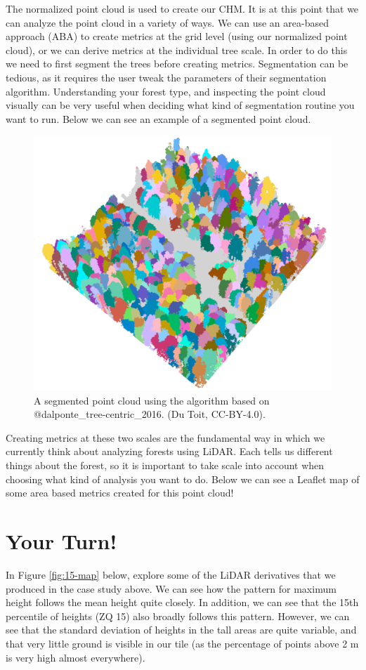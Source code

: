 \documentclass[
]{book}
\begin{document}
The normalized point cloud is used to create our CHM. It is at this point that we can analyze the point cloud in a variety of ways. We can use an area-based approach (ABA) to create metrics at the grid level (using our normalized point cloud), or we can derive metrics at the individual tree scale. In order to do this we need to first segment the trees before creating metrics. Segmentation can be tedious, as it requires the user tweak the parameters of their segmentation algorithm. Understanding your forest type, and inspecting the point cloud visually can be very useful when deciding what kind of segmentation routine you want to run. Below we can see an example of a segmented point cloud.

\begin{figure}
\includegraphics[width=0.6\linewidth]{images/15-las-segmented} \caption{A segmented point cloud using the algorithm based on @dalponte_tree-centric_2016. (Du Toit, CC-BY-4.0).}\label{fig:15-las-segmented}
\end{figure}

Creating metrics at these two scales are the fundamental way in which we currently think about analyzing forests using LiDAR. Each tells us different things about the forest, so it is important to take scale into account when choosing what kind of analysis you want to do. Below we can see a Leaflet map of some area based metrics created for this point cloud!

\hypertarget{your-turn-9}{%
\section*{Your Turn!}\label{your-turn-9}}

In Figure \ref{fig:15-map} below, explore some of the LiDAR derivatives that we produced in the case study above. We can see how the pattern for maximum height follows the mean height quite closely. In addition, we can see that the 15th percentile of heights (ZQ 15) also broadly follows this pattern. However, we can see that the standard deviation of heights in the tall areas are quite variable, and that very little ground is visible in our tile (as the percentage of points above 2 m is very high almost everywhere).
\end{document}
